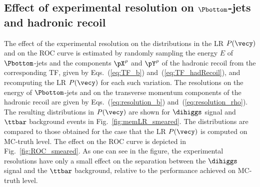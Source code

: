 \subsection{Effect of experimental resolution on \texorpdfstring{$\Pbottom$}{b}-jets and hadronic recoil}

The effect of the experimental resolution on the distributions in the LR $P(\vecy)$ and on the ROC curve is estimated
by randomly sampling the energy $E$ of $\Pbottom$-jets and the components $\pX^{\rho}$ and $\pY^{\rho}$ of the hadronic recoil from the corresponding TF,
given by Eqs.~(\ref{eq:TF_b}) and~(\ref{eq:TF_hadRecoil}), and recomputing the LR $P(\vecy)$ for each such variation.
The resolutions on the energy of $\Pbottom$-jets and on the transverse momentum components of the hadronic recoil 
are given by Eqs.~(\ref{eq:resolution_b}) and~(\ref{eq:resolution_rho}).
The resulting distributions in $P(\vecy)$ are shown for $\dihiggs$ signal and $\ttbar$ background events in Fig.~\ref{fig:memLR_smeared}.
The distributions are compared to those obtained for the case that the LR $P(\vecy)$ is computed on MC-truth level.
The effect on the ROC curve is depicted in Fig.~\ref{fig:ROC_smeared}.
As one can see in the figure, the experimental resolutions have only a small effect on the separation between the $\dihiggs$ signal and the $\ttbar$ background,
relative to the performance achieved on MC-truth level.

